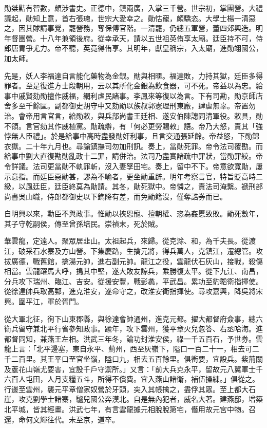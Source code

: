 \begin{pinyinscope}
勛桀黠有智數，頗涉書史。正德中，鎮兩廣，入掌三千營。世宗初，掌團營。大禮議起，勛知上意，首右張璁，世宗大愛幸之。勛怙寵，頗驕恣。大學士楊一清惡之，因其賕請事覺，罷營務，奪保傅官階。一清罷，仍總五軍營，董四郊興造。明年督團營。十八年兼領後府。從幸承天，請以五世祖英侑享太廟。廷臣持不可，侍郎唐胄爭尤力。帝不聽，英竟得侑享。其明年，獻皇稱宗，入太廟，進勛翊國公，加太師。

先是，妖人李福達自言能化藥物為金銀。勛與相暱。福達敗，力持其獄，廷臣多得罪者。至是復進方士段朝用，云以其所化金銀為飲食器，可不死。帝益以為忠。給事中戚賢劾勛擅作威福，網利虐民諸事。李鳳來等復以為言。下有司勘，勛京師店舍多至千餘區。副都御史胡守中又劾勛以族叔郭憲理刑東廠，肆虐無辜。帝置勿治。會帝用言官言，給勛敕，與兵部尚書王廷相、遂安伯陳譓同清軍役。敕具，勛不領。言官劾其作威植黨。勛疏辯，有「何必更勞賜敕」語。帝乃大怒，責其「強悖無人臣禮」。於是給事中高時盡發勛奸利事，且言交通張延齡。帝益怒，下勛錦衣獄。二十年九月也。尋諭鎮撫司勿加刑訊。奏上，當勛死罪。帝令法司覆勘。而給事中劉大直復勘勛亂政十二罪，請併治。法司乃盡實諸疏中罪狀，當勛罪絞。帝令詳議。法司更當勛不軌罪斬，沒入妻孥田宅。奏上，留中不下。帝意欲寬勛，屢示意指。而廷臣惡勛甚，謬為不喻者，更坐勛重辟。明年考察言官，特旨貶高時二級，以風廷臣，廷臣終莫為勛請。其冬，勛死獄中。帝憐之，責法司淹繫。褫刑部尚書吳山職，侍郎都御史以下鐫降有差，而免勛籍沒，僅奪誥券而已。

自明興以來，勳臣不與政事。惟勛以挾恩寵、擅朝權、恣為姦慝致敗。勛死數年，其子守乾嗣侯，傳至曾孫培民。崇禎末，死於賊。

華雲龍，定遠人。聚眾居韭山。太祖起兵，來歸。從克滁、和，為千夫長。從渡江，破采石水寨及方山營。下集慶路，生擒元將，得兵萬人，克鎮江，遷總管。攻拔廣德，戰舊館，擒湯元帥，進右副元帥。龍江之役，雲龍伏石灰山，接戰，殺傷相當。雲龍躍馬大呼，搗其中堅，遂大敗友諒兵，乘勝復太平。從下九江、南昌，分兵攻下瑞州、臨江、吉安。從援安豐，戰彭蠡，平武昌。累功至豹韜衛指揮使。從徐達帥兵取高郵，進克淮安，遂命守之，改淮安衛指揮使。尋攻嘉興，降吳將宋興。圍平江，軍於胥門。

從大軍北征，徇下山東郡縣，與徐達會帥通州，進克元都。擢大都督府僉事，總六衛兵留守兼北平行省參知政事。踰年，攻下雲州，獲平章火兒忽答、右丞哈海。進都督同知，兼燕王左相。洪武三年冬，論功封淮安侯，祿一千五百石，予世券。雲龍上言：「北平邊塞，東自永平、薊州，西至灰嶺下，隘口一百二十一，相去可二千二百里。其王平口至官坐嶺，隘口九，相去五百餘里。俱衝要，宜設兵。紫荊關及蘆花山嶺尤要害，宜設千戶守禦所。」又言：「前大兵克永平，留故元八翼軍士千六百人屯田，人月支糧五斗，所得不償費。宜入燕山諸衛，補伍操練。」俱從之。行邊至雲州，襲元平章僧家奴營於牙頭，突入其帳擒之，盡俘其眾。至上都大石崖，攻克劉學士諸寨，驢兒國公奔漠北。自是無內犯者，威名大著。建燕邸，增築北平城，皆其經畫。洪武七年，有言雲龍據元相脫脫第宅，僭用故元宮中物。召還，命何文輝往代。未至京，道卒。


\end{pinyinscope}
